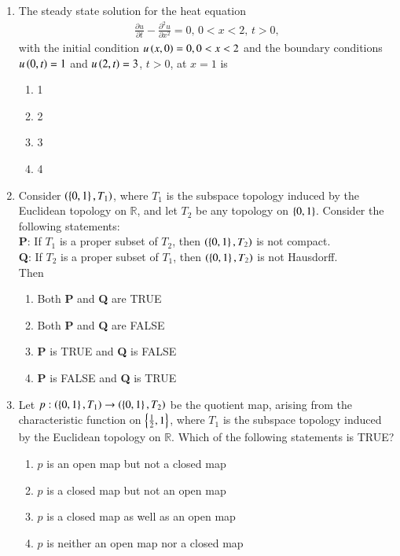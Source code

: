 \documentclass[journal,12pt,onecolumn]{IEEEtran}
\theoremstyle{remark}
\begin{document}
\begin{enumerate}
\item The steady state solution for the heat equation
	\begin{align*}
		\frac{\partial u}{\partial t}-\frac{\partial^2 u}{\partial x^2}=0, \, 0<x<2, \, t>0,
	\end{align*}
	with the initial condition $u\left(x,0\right)=0, 0<x<2$ and the boundary conditions $u\left(0,t\right)=1$ and $u\left(2,t\right)=3$, $t>0$, at $x=1$ is

	\begin{enumerate}
		\item 1
		\item 2
		\item 3
		\item 4
	\end{enumerate}

\item Consider $\left(\left\{0,1\right\}, T_1\right)$, where $T_1$ is the subspace topology induced by the Euclidean topology on $\mathbb{R}$, and let $T_2$ be any topology on $\left\{0,1\right\}$. Consider the following statements: \\
	\textbf{P}: If $T_1$ is a proper subset of $T_2$, then $\left(\left\{0,1\right\}, T_2\right)$ is not compact. \\
	\textbf{Q}: If $T_2$ is a proper subset of $T_1$, then $\left(\left\{0,1\right\}, T_2\right)$ is not Hausdorff. \\
	Then
	\begin{enumerate}
		\item Both \textbf{P} and \textbf{Q} are TRUE
		\item Both \textbf{P} and \textbf{Q} are FALSE
		\item \textbf{P} is TRUE and \textbf{Q} is FALSE
		\item \textbf{P} is FALSE and \textbf{Q} is TRUE
	\end{enumerate}

\item Let $p:\left(\left\{0,1\right\}, T_1\right) \to \left(\left\{0,1\right\}, T_2\right)$ be the quotient map, arising from the characteristic function on $\left\{ \frac{1}{2}, 1\right\}$, where $T_1$ is the subspace topology induced by the Euclidean topology on $\mathbb{R}$. Which of the following statements is TRUE?
	\begin{enumerate}
		\item $p$ is an open map but not a closed map
		\item $p$ is a closed map but not an open map
		\item $p$ is a closed map as well as an open map
		\item $p$ is neither an open map nor a closed map
	\end{enumerate}



\end{enumerate}
\end{document}
